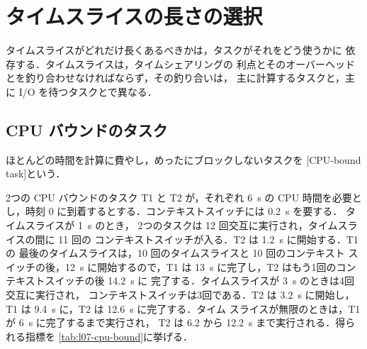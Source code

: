 \documentclass[../main.tex]{subfiles}
\begin{document}
\section{タイムスライスの長さの選択}
\label{sec:l07-timeslice}

タイムスライスがどれだけ長くあるべきかは，タスクがそれをどう使うかに
依存する．タイムスライスは，タイムシェアリングの
利点とそのオーバーヘッドとを釣り合わせなければならず，その釣り合いは，
主に計算するタスクと，主に I/O を待つタスクとで異なる．

\subsection{CPU バウンドのタスク}

ほとんどの時間を計算に費やし，めったにブロックしないタスクを
[CPU-bound task]という．

\begin{example}
  \label{ex:l07-cpu-bound}
  2つの CPU バウンドのタスク T1 と T2 が，それぞれ \SI{6}{\second} の
  CPU 時間を必要とし，時刻 0 に到着するとする．コンテキストスイッチには
  \SI{0.2}{\second} を要する．%
  タイムスライスが \SI{1}{\second} のとき，
  2つのタスクは 12 回交互に実行され，タイムスライスの間に 11 回の
  コンテキストスイッチが入る．T2 は \SI{1.2}{\second} に開始する．T1 の
  最後のタイムスライスは，10 回のタイムスライスと 10 回のコンテキスト
  スイッチの後，\SI{12}{\second} に開始するので，T1 は \SI{13}{\second}
  に完了し，T2 はもう1回のコンテキストスイッチの後 \SI{14.2}{\second} に
  完了する．タイムスライスが \SI{3}{\second} のときは4回交互に実行され，
  コンテキストスイッチは3回である．T2 は \SI{3.2}{\second} に開始し，T1
  は \SI{9.4}{\second} に，T2 は \SI{12.6}{\second} に完了する．タイム
  スライスが無限のときは，T1 が \SI{6}{\second} に完了するまで実行され，
  T2 は 6.2 から \SI{12.2}{\second} まで実行される．得られる指標を
  \cref{tab:l07-cpu-bound}に挙げる．
\end{example}
\end{document}
